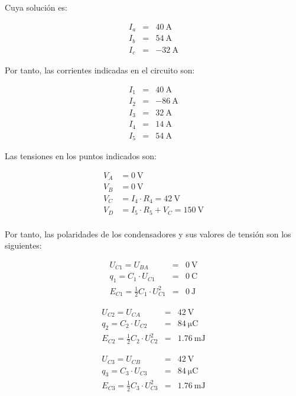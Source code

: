 Cuya solución es:

\begin{eqnarray*}
I_a & = & \qty{40}{\ampere}\\
I_b & = & \qty{54}{\ampere}\\
I_c & = & -\qty{32}{\ampere}
\end{eqnarray*}

Por tanto, las corrientes indicadas en el circuito son:

\begin{eqnarray*}
I_1 & = & \qty{40}{\ampere}\\
I_2 & = & \qty{-86}{\ampere}\\
I_3 & = &  \qty{32}{\ampere}\\
I_4 & = &  \qty{14}{\ampere}\\
I_5 & = &  \qty{54}{\ampere}
\end{eqnarray*}

Las tensiones en los puntos indicados son:

\begin{align*}
V_A &= \qty{0}{\volt}\\
V_B &= \qty{0}{\volt}\\
V_C &= I_4 \cdot R_4 = \qty{42}{\volt}\\
V_D &= I_5 \cdot R_5 + V_C = \qty{150}{\volt}\\
\end{align*}

Por tanto, las polaridades de los condensadores y sus valores de tensión son los siguientes:

\begin{eqnarray*}
U_{C1} = U_{BA} & = & \qty{0}{\volt}\\
q_1 = C_1 \cdot U_{C1} & = & \qty{0}{\coulomb}\\
E_{C1} = \frac{1}{2} C_1 \cdot U_{C1}^2 & = & \qty{0}{\joule}
\end{eqnarray*}

\begin{eqnarray*}
U_{C2} = U_{CA} & = & \qty{42}{\volt}\\
q_2 = C_2 \cdot U_{C2} & = & \qty{84}{\micro\coulomb}\\
E_{C2} = \frac{1}{2} C_2 \cdot U_{C2}^2 & = & \qty{1.76}{\milli\joule}
\end{eqnarray*}

\begin{eqnarray*}
U_{C3} = U_{CB} & = & \qty{42}{\volt}\\
q_3 = C_3 \cdot U_{C3} & = & \qty{84}{\micro\coulomb}\\
E_{C3} = \frac{1}{2} C_3 \cdot U_{C3}^2 & = & \qty{1.76}{\milli\joule}
\end{eqnarray*}

